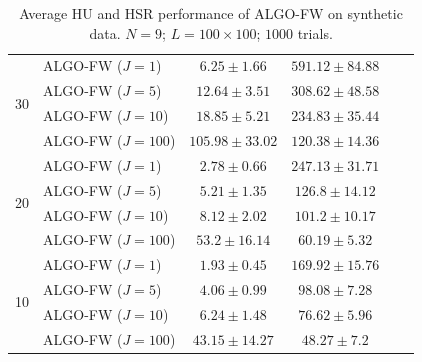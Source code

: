 \begin{table}[h]
\begin{adjustbox}{max width=\textwidth}
\begin{tabular}{|c|l|c|c|c|c|}
\multirow{4}{*}{30} & ALGO-FW ($J=1$)            & $6.25     \pm 1.66$   & $591.12   \pm 84.88$  \tabularnewline
                    & ALGO-FW ($J=5$)            & $12.64    \pm 3.51$   & $308.62   \pm 48.58$  \tabularnewline
                    & ALGO-FW ($J=10$)           & $18.85    \pm 5.21$   & $234.83   \pm 35.44$  \tabularnewline
                    & ALGO-FW ($J=100$)          & $105.98   \pm 33.02$  & $120.38   \pm 14.36$  \tabularnewline \cline{1-4}
\multirow{4}{*}{20} & ALGO-FW ($J=1$)            & $2.78     \pm 0.66$   & $247.13   \pm 31.71$  \tabularnewline
                    & ALGO-FW ($J=5$)            & $5.21     \pm 1.35$   & $126.8    \pm 14.12$  \tabularnewline
                    & ALGO-FW ($J=10$)           & $8.12     \pm 2.02$   & $101.2    \pm 10.17$  \tabularnewline
                    & ALGO-FW ($J=100$)          & $53.2     \pm 16.14$  & $60.19    \pm 5.32$   \tabularnewline \cline{1-4}
\multirow{4}{*}{10} & ALGO-FW ($J=1$)            & $1.93     \pm 0.45$   & $169.92   \pm 15.76$  \tabularnewline
                    & ALGO-FW ($J=5$)            & $4.06     \pm 0.99$   & $98.08    \pm 7.28$   \tabularnewline
                    & ALGO-FW ($J=10$)           & $6.24     \pm 1.48$   & $76.62    \pm 5.96$   \tabularnewline
                    & ALGO-FW ($J=100$)          & $43.15    \pm 14.27$  & $48.27    \pm 7.2$    \tabularnewline \cline{1-4}
\end{tabular}
\end{adjustbox}
\caption{Average HU and HSR performance of ALGO-FW on synthetic data.
         $N = 9$; $L = 100 \times 100$; $1000$ trials.}
\label{table:results_full_FW_MO9}
\end{table}

\newpage

